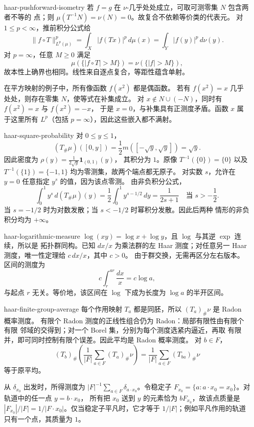 \begin{solution}{haar-pushforward-isometry}
若 $f=g$ 在 $\nu$-几乎处处成立，可取可测零集 $N$ 包含两者不等的
点；则 $\mu(T^{-1}N)=\nu(N)=0$。故复合不依赖等价类的代表元。
对 $1\le p<\infty$，推前积分公式给
\[
 \|f\circ T\|_{L^p(\mu)}^p
 =\int_X |f(Tx)|^p\,d\mu(x)
 =\int_Y|f(y)|^p\,d\nu(y).
\]
对 $p=\infty$，任意 $M\ge0$ 满足
\[
 \mu(\{|f\circ T|>M\})=\nu(\{|f|>M\}),
\]
故本性上确界也相同。线性来自逐点复合，等距性蕴含单射。

在平方映射的例子中，所有像函数 $f(x^2)$ 都是偶函数。
若有 $f(x^2)=x$ 几乎处处，则存在零集 $N$，使等式在补集成立。
对 $x\notin N\cup(-N)$，同时有 $f(x^2)=x$ 与 $f(x^2)=-x$，
于是 $x=0$，与补集具有正测度矛盾。函数 $x$ 属于这里所有
$L^p$（包括 $p=\infty$），因此这些嵌入都不满射。
\end{solution}

\begin{solution}{haar-square-probability}
对 $0\le y\le1$，
\[
 (T_\#\mu)([0,y])=\frac12 m([-\sqrt y,\sqrt y])=\sqrt y.
\]
因此密度为 $\rho(y)=\frac1{2\sqrt y}\mathbf1_{(0,1)}(y)$，
其积分为 $1$。原像 $T^{-1}(\{0\})=\{0\}$ 以及
$T^{-1}(\{1\})=\{-1,1\}$ 均为零测集，故两个端点都无原子。
对实数 $s$，允许在 $y=0$ 任意指定 $y^s$ 的值，因为该点零测。
由非负积分公式，
\[
 \int_0^1y^s\,d(T_\#\mu)(y)=\frac12\int_0^1 y^{s-1/2}\,dy
 =\frac1{2s+1}\quad\text{当 }s>-\frac12.
\]
当 $s=-1/2$ 时为对数发散；当 $s<-1/2$ 时幂积分发散。因此后两种
情形的非负积分均为 $+\infty$。
\end{solution}

\begin{solution}{haar-logarithmic-measure}
$\log(xy)=\log x+\log y$，且 $\log$ 与其逆 $\exp$ 连续，所以是
拓扑群同构。已知 $dx/x$ 为乘法群的左 Haar 测度；对任意另一 Haar
测度，唯一性定理给 $c\,dx/x$，其中 $c>0$。
由于群交换，无需再区分左右版本。区间的测度为
\[
 c\int_r^{ar}\frac{dx}{x}=c\log a,
\]
与起点 $r$ 无关。等价地，该区间在 $\log$ 下成为长度为 $\log a$
的半开区间。
\end{solution}

\begin{solution}{haar-finite-group-average}
每个作用映射 $T_a$ 都是同胚，所以 $(T_a)_\#\nu$ 是 Radon 概率测度。
有限个 Radon 测度的正线性组合仍为 Radon：局部有限性由有限个有限
邻域的交得到；对一个 Borel 集，分别为每个测度选紧内逼近，再取
有限并，即可同时控制有限个误差。因此平均是 Radon 概率测度。
对 $b\in F$，
\[
 (T_b)_\#\left(\frac1{|F|}\sum_{a\in F}(T_a)_\#\nu\right)
 =\frac1{|F|}\sum_{a\in F}(T_{ba})_\#\nu
\]
等于原平均。

从 $\delta_{x_0}$ 出发时，所得测度为
$|F|^{-1}\sum_{a\in F}\delta_{a\cdot x_0}$。令稳定子
$F_{x_0}=\{a:a\cdot x_0=x_0\}$。对轨道中的任一点 $y=b\cdot x_0$，
所有把 $x_0$ 送到 $y$ 的元素恰为 $bF_{x_0}$，故该点质量是
$|F_{x_0}|/|F|=1/|F\cdot x_0|$。仅当稳定子平凡时，它才等于
$1/|F|$；例如平凡作用的轨道只有一个点，其质量为 $1$。
\end{solution}

